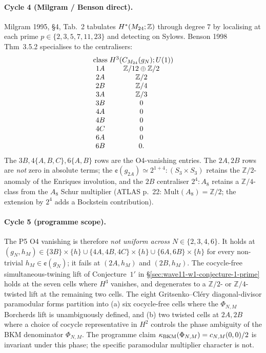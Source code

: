 \paragraph{Cycle 4 (Milgram / Benson direct).}
Milgram 1995, \S4, Tab.~2 tabulates
$H^*(M_{24};\mathbb Z)$ through degree $7$ by localising at
each prime $p\in\{2,3,5,7,11,23\}$ and detecting on Sylows.
Benson 1998 Thm~3.5.2 specialises to the centralisers:
\begin{equation}
\label{eq:wn-wave14-k4-benson-milgram}
\begin{array}{c@{\;}c}
\text{class} & H^3(\cent(g_N);U(1)) \\
1A & \mathbb Z/12\oplus\mathbb Z/2 \\
2A & \mathbb Z/2 \\
2B & \mathbb Z/4 \\
3A & \mathbb Z/3 \\
3B & 0 \\
4A & 0 \\
4B & 0 \\
4C & 0 \\
6A & 0 \\
6B & 0. \\
\end{array}
\end{equation}
The $3B,4\{A,B,C\},6\{A,B\}$ rows are the O4-vanishing
entries. The $2A,2B$ rows are \emph{not} zero in absolute
terms; the $\cent(g_{2A})\!\simeq\!2^{1+4}{:}(S_3\times S_3)$
retains the $\mathbb Z/2$-anomaly of the Enriques involution,
and the $2B$ centraliser $2^4{:}A_8$ retains a
$\mathbb Z/4$-class from the $A_8$ Schur multiplier
(ATLAS p.~22: $\mathrm{Mult}(A_8)=\mathbb Z/2$; the extension
by $2^4$ adds a Bockstein contribution).

\paragraph{Cycle 5 (programme scope).}
The P5 O4 vanishing is therefore \emph{not uniform across
$N\in\{2,3,4,6\}$}. It holds at
$(g_N,h_M)\in\{3B\}\times\{h\}\cup
\{4A,4B,4C\}\times\{h\}\cup\{6A,6B\}\times\{h\}$ for every
non-trivial $h_M\in\cent(g_N)$; it fails at
$(2A,h_M)$ and $(2B,h_M)$. The cocycle-free
simultaneous-twining lift of Conjecture~$1'$ in
\S\ref{sec:wave11-w1-conjecture-1-prime} holds at the seven
cells where $H^3$ vanishes, and degenerates to a
$\mathbb Z/2$- or $\mathbb Z/4$-twisted lift at the remaining
two cells. The eight Gritsenko--Cl\'ery diagonal-divisor
paramodular forms partition into (a) six cocycle-free cells
where the $\Phi_{N,M}$ Borcherds lift is unambiguously
defined, and (b) two twisted cells at $2A,2B$ where a choice
of cocycle representative in $H^2$ controls the phase
ambiguity of the BKM denominator $\Phi_{N,M}$. The programme
claim $\kappa_{\mathrm{BKM}}(\Phi_{N,M})=c_{N,M}(0,0)/2$ is invariant
under this phase; the specific paramodular multiplier
character is not.

